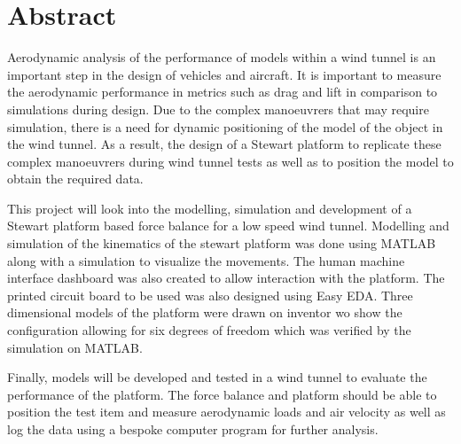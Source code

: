 
\section*{Abstract}
\label{sec:Abstract}
Aerodynamic analysis of the performance of models within a wind tunnel is an important step in the design of vehicles and aircraft. It is important to measure the aerodynamic performance in metrics such as drag and lift in comparison to simulations during design.
Due to the complex manoeuvrers that may require simulation, there is a need for dynamic positioning of the model of the object in the wind tunnel. As a result, the design of a Stewart platform to replicate these complex manoeuvrers during wind tunnel tests as well as to position the model to obtain the required data.

This project will look into the modelling, simulation and development of a Stewart
platform based force balance for a low speed wind tunnel. 
Modelling and simulation of the kinematics of the stewart platform was done using MATLAB along with a simulation to visualize the movements. 
The human machine interface dashboard was also created to allow interaction with the platform. The printed circuit board to be used was also designed using Easy EDA. Three dimensional models of the platform were drawn on inventor wo show the configuration allowing for six degrees of freedom which was verified by the simulation on MATLAB.

Finally, models will be developed and tested in a wind tunnel to evaluate the performance
of the platform. The force balance and platform should be able to position the test
item and measure aerodynamic loads and air velocity as well as log the data using a bespoke computer program for further analysis.


